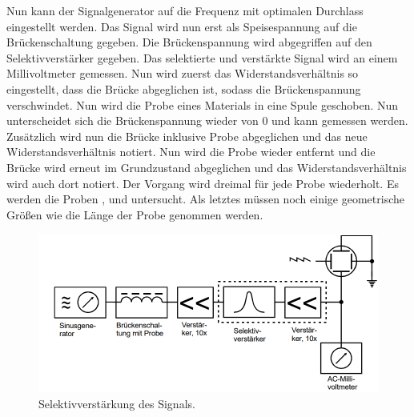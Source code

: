 \noindent Nun kann der Signalgenerator auf die Frequenz mit optimalen Durchlass eingestellt werden.
Das Signal wird nun erst als Speisespannung auf die Brückenschaltung gegeben. Die Brückenspannung wird abgegriffen auf den Selektivverstärker gegeben.
Das selektierte und verstärkte Signal wird an einem Millivoltmeter gemessen. Nun wird zuerst das Widerstandsverhältnis so eingestellt, dass die Brücke abgeglichen ist, sodass
die Brückenspannung verschwindet. Nun wird die Probe eines Materials in eine Spule geschoben. Nun unterscheidet sich die Brückenspannung wieder
von 0 und kann gemessen werden. Zusätzlich wird nun die Brücke inklusive Probe abgeglichen und das neue
Widerstandsverhältnis notiert. Nun wird die Probe wieder entfernt und die Brücke wird erneut im Grundzustand abgeglichen und das Widerstandsverhältnis wird auch dort notiert.
Der Vorgang wird dreimal für jede Probe wiederholt. Es werden die Proben , und  untersucht.
Als letztes müssen noch einige geometrische Größen wie die Länge der Probe genommen werden.
\begin{figure}[H]
    \centering
    \includegraphics[scale=0.7]{content/Messschaltung.png}
    \caption{Selektivverstärkung des Signals.}
    \label{fig:Messung}
\end{figure}
